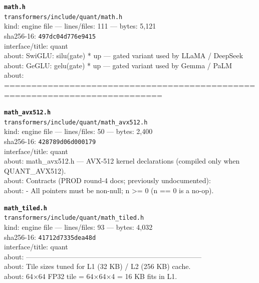 \noindent\textbf{\texttt{math.h}}\\
\texttt{transformers/include/quant/math.h}\\
kind: engine file --- lines/files: 111 --- bytes: 5,121\\
sha256-16: \texttt{497dc04d776e9415}\\
interface/title: quant\\
about: SwiGLU: silu(gate) * up — gated variant used by LLaMA / DeepSeek\\
about: GeGLU: gelu(gate) * up — gated variant used by Gemma / PaLM\\
about: ===========================================================================\\
\vspace*{6.0pt}

\noindent\textbf{\texttt{math\_avx512.h}}\\
\texttt{transformers/include/quant/math\_avx512.h}\\
kind: engine file --- lines/files: 50 --- bytes: 2,400\\
sha256-16: \texttt{428789d06d000179}\\
interface/title: quant\\
about: math\_avx512.h — AVX-512 kernel declarations (compiled only when QUANT\_AVX512).\\
about: Contracts (PROD round-4 docs; previously undocumented):\\
about: - All pointers must be non-null; n >= 0 (n == 0 is a no-op).\\
\vspace*{6.0pt}

\noindent\textbf{\texttt{math\_tiled.h}}\\
\texttt{transformers/include/quant/math\_tiled.h}\\
kind: engine file --- lines/files: 93 --- bytes: 4,032\\
sha256-16: \texttt{41712d7335dea48d}\\
interface/title: quant\\
about: ---------------------------------------------------------------------------\\
about: Tile sizes tuned for L1 (32 KB) / L2 (256 KB) cache.\\
about: 64×64 FP32 tile = 64×64×4 = 16 KB fits in L1.\\
\vspace*{6.0pt}

